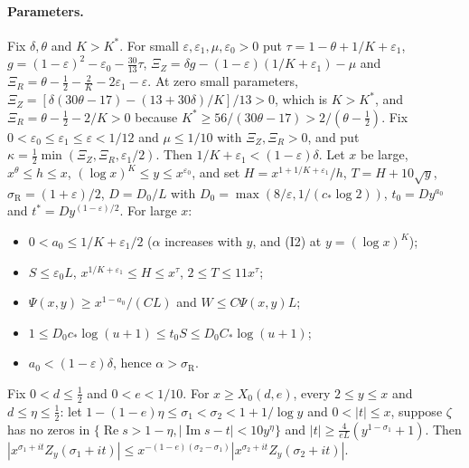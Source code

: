 \paragraph{Parameters.}
Fix $\delta,\theta$ and $K>K^*$. For small $\varepsilon,\varepsilon_1,\mu,\varepsilon_0>0$ put
$\tau=1-\theta+1/K+\varepsilon_1$, $g=(1-\varepsilon)^2-\varepsilon_0-\tfrac{30}{13}\tau$,
$\Xi_Z=\delta g-(1-\varepsilon)(1/K+\varepsilon_1)-\mu$ and
$\Xi_R=\theta-\tfrac12-\tfrac2K-2\varepsilon_1-\varepsilon$. At zero small parameters,
$\Xi_Z=[\delta(30\theta-17)-(13+30\delta)/K]/13>0$, which is $K>K^*$, and $\Xi_R=\theta-\tfrac12-2/K>0$ because
$K^*\ge56/(30\theta-17)>2/(\theta-\tfrac12)$. Fix $0<\varepsilon_0\le\varepsilon_1\le\varepsilon<1/12$ and
$\mu\le1/10$ with $\Xi_Z,\Xi_R>0$, and put $\kappa=\tfrac12\min(\Xi_Z,\Xi_R,\varepsilon_1/2)$. Then
$1/K+\varepsilon_1<(1-\varepsilon)\delta$. Let $x$ be large, $x^\theta\le h\le x$,
$(\log x)^K\le y\le x^{\varepsilon_0}$, and set $H=x^{1+1/K+\varepsilon_1}/h$, $T=H+10\sqrt y$,
$\sigma_{\mathrm R}=(1+\varepsilon)/2$, $D=D_0/L$ with $D_0=\max(8/\varepsilon,1/(c_*\log2))$, $t_0=Dy^{a_0}$ and
$t^*=Dy^{(1-\varepsilon)/2}$. For large $x$:
\begin{itemize}
\item[(P1)] $0<a_0\le1/K+\varepsilon_1/2$ ($\alpha$ increases with $y$, and (I2) at $y=(\log x)^K$);
\item[(P2)] $S\le\varepsilon_0L$, $x^{1/K+\varepsilon_1}\le H\le x^\tau$, $2\le T\le11x^\tau$;
\item[(P3)] $\Psi(x,y)\ge x^{1-a_0}/(CL)$ and $W\le C\Psi(x,y)L$;
\item[(P4)] $1\le D_0c_*\log(u+1)\le t_0S\le D_0C_*\log(u+1)$;
\item[(P5)] $a_0<(1-\varepsilon)\delta$, hence $\alpha>\sigma_{\mathrm R}$.
\end{itemize}

\begin{lemma}\label{lem:shift}
Fix $0<d\le\tfrac12$ and $0<e<1/10$. For $x\ge X_0(d,e)$, every $2\le y\le x$ and $d\le\eta\le\tfrac12$: let
$1-(1-e)\eta\le\sigma_1<\sigma_2<1+1/\log y$ and $0<|t|\le x$, suppose $\zeta$ has no zeros in
$\{\operatorname{Re}s>1-\eta,|\operatorname{Im}s-t|<10y^\eta\}$ and $|t|\ge\frac4{eL}(y^{1-\sigma_1}+1)$. Then
$|x^{\sigma_1+it}Z_y(\sigma_1+it)|\le x^{-(1-e)(\sigma_2-\sigma_1)}|x^{\sigma_2+it}Z_y(\sigma_2+it)|$.
\end{lemma}


